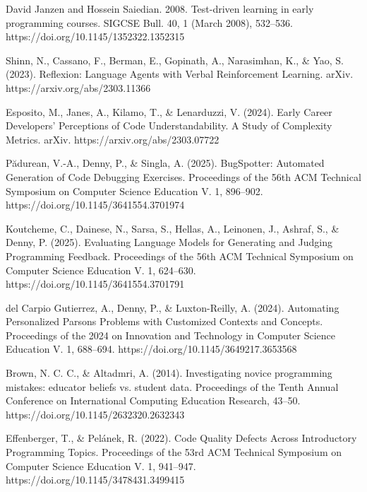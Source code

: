 \documentclass[12pt]{extarticle}
\begin{document}
\begin{thebibliography}{9}
David Janzen and Hossein Saiedian. 2008. Test-driven learning in early programming courses. SIGCSE Bull. 40, 1 (March 2008), 532–536. https://doi.org/10.1145/1352322.1352315

Shinn, N., Cassano, F., Berman, E., Gopinath, A., Narasimhan, K., \& Yao, S. (2023). Reflexion: Language Agents with Verbal Reinforcement Learning. arXiv. https://arxiv.org/abs/2303.11366

Esposito, M., Janes, A., Kilamo, T., \& Lenarduzzi, V. (2024). Early Career Developers' Perceptions of Code Understandability. A Study of Complexity Metrics. arXiv. https://arxiv.org/abs/2303.07722

Pădurean, V.-A., Denny, P., \& Singla, A. (2025). BugSpotter: Automated Generation of Code Debugging Exercises. Proceedings of the 56th ACM Technical Symposium on Computer Science Education V. 1, 896–902. https://doi.org/10.1145/3641554.3701974

Koutcheme, C., Dainese, N., Sarsa, S., Hellas, A., Leinonen, J., Ashraf, S., \& Denny, P. (2025). Evaluating Language Models for Generating and Judging Programming Feedback. Proceedings of the 56th ACM Technical Symposium on Computer Science Education V. 1, 624–630. https://doi.org/10.1145/3641554.3701791

del Carpio Gutierrez, A., Denny, P., \& Luxton-Reilly, A. (2024). Automating Personalized Parsons Problems with Customized Contexts and Concepts. Proceedings of the 2024 on Innovation and Technology in Computer Science Education V. 1, 688–694. https://doi.org/10.1145/3649217.3653568

Brown, N. C. C., \& Altadmri, A. (2014). Investigating novice programming mistakes: educator beliefs vs. student data. Proceedings of the Tenth Annual Conference on International Computing Education Research, 43–50. https://doi.org/10.1145/2632320.2632343

Effenberger, T., \& Pelánek, R. (2022). Code Quality Defects Across Introductory Programming Topics. Proceedings of the 53rd ACM Technical Symposium on Computer Science Education V. 1, 941--947. https://doi.org/10.1145/3478431.3499415

\end{thebibliography}
\end{document}
